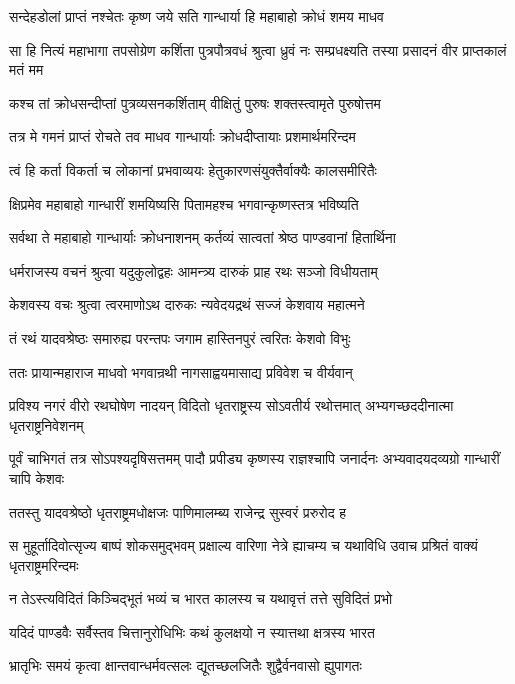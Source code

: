 \twolineshloka
{सन्देहडोलां प्राप्तं नश्चेतः कृष्ण जये सति}
{गान्धार्या हि महाबाहो क्रोधं शमय माधव}


\threelineshloka
{सा हि नित्यं महाभागा तपसोग्रेण कर्शिता}
{पुत्रपौत्रवधं श्रुत्वा ध्रुवं नः सम्प्रधक्ष्यति}
{तस्या प्रसादनं वीर प्राप्तकालं मतं मम}


\twolineshloka
{कश्च तां क्रोधसन्दीप्तां पुत्रव्यसनकर्शिताम्}
{वीक्षितुं पुरुषः शक्तस्त्वामृते पुरुषोत्तम}


\twolineshloka
{तत्र मे गमनं प्राप्तं रोचते तव माधव}
{गान्धार्याः क्रोधदीप्तायाः प्रशमार्थमरिन्दम}


\twolineshloka
{त्वं हि कर्ता विकर्ता च लोकानां प्रभवाव्ययः}
{हेतुकारणसंयुक्तैर्वाक्यैः कालसमीरितैः}


\twolineshloka
{क्षिप्रमेव महाबाहो गान्धारीं शमयिष्यसि}
{पितामहश्च भगवान्कृष्णस्तत्र भविष्यति}


\twolineshloka
{सर्वथा ते महाबाहो गान्धार्याः क्रोधनाशनम्}
{कर्तव्यं सात्वतां श्रेष्ठ पाण्डवानां हितार्थिना}


\twolineshloka
{धर्मराजस्य वचनं श्रुत्वा यदुकुलोद्वहः}
{आमन्त्र्य दारुकं प्राह रथः सञ्जो विधीयताम्}


\twolineshloka
{केशवस्य वचः श्रुत्वा त्वरमाणोऽथ दारुकः}
{न्यवेदयद्रथं सज्जं केशवाय महात्मने}


\twolineshloka
{तं रथं यादवश्रेष्ठः समारुह्य परन्तपः}
{जगाम हास्तिनपुरं त्वरितः केशवो विभुः}


\twolineshloka
{ततः प्रायान्महाराज माधवो भगवान्रथी}
{नागसाह्वयमासाद्य प्रविवेश च वीर्यवान्}


\threelineshloka
{प्रविश्य नगरं वीरो रथघोषेण नादयन्}
{विदितो धृतराष्ट्रस्य सोऽवतीर्य रथोत्तमात्}
{अभ्यगच्छददीनात्मा धृतराष्ट्रनिवेशनम्}


पूर्वं चाभिगतं तत्र सोऽपश्यदृषिसत्तमम्
\twolineshloka
{पादौ प्रपीड्य कृष्णस्य राज्ञश्चापि जनार्दनः}
{अभ्यवादयदव्यग्रो गान्धारीं चापि केशवः}


\twolineshloka
{ततस्तु यादवश्रेष्ठो धृतराष्ट्रमधोक्षजः}
{पाणिमालम्ब्य राजेन्द्र सुस्वरं प्ररुरोद ह}


\threelineshloka
{स मुहूर्तादिवोत्सृज्य बाष्पं शोकसमुद्भवम्}
{प्रक्षाल्य वारिणा नेत्रे ह्याचम्य च यथाविधि}
{उवाच प्रश्रितं वाक्यं धृतराष्ट्रमरिन्दमः}


\twolineshloka
{न तेऽस्त्यविदितं किञ्चिद्भूतं भव्यं च भारत}
{कालस्य च यथावृत्तं तत्ते सुविदितं प्रभो}


\twolineshloka
{यदिदं पाण्डवैः सर्वैस्तव चित्तानुरोधिभिः}
{कथं कुलक्षयो न स्यात्तथा क्षत्रस्य भारत}


\twolineshloka
{भ्रातृभिः समयं कृत्वा क्षान्तवान्धर्मवत्सलः}
{द्यूतच्छलजितैः शुद्वैर्वनवासो ह्युपागतः}


